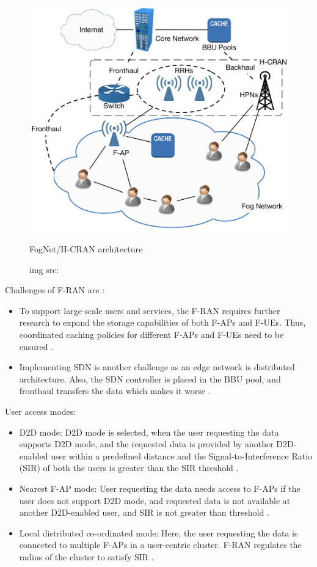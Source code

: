 \begin{figure}[H]
    \centering
    \includegraphics[width=.5\linewidth]{image/FogNet or H-CRAN architecture.png}
    \caption{FogNet/H-CRAN architecture}
    \caption*{img src: \cite{mukherjee2018survey}}
    \label{fig:fognet/h-cran architecture}
\end{figure}

Challenges of F-RAN are \cite{guizani2017cran}:
\begin{itemize}
    \item To support large-scale users and services, the F-RAN requires further research to expand the storage capabilities of both F-APs and F-UEs. Thus, coordinated caching policies for different F-APs and F-UEs need to be ensured \cite{guizani2017cran}.
    \item Implementing SDN is another challenge as an edge network is distributed architecture. Also, the SDN controller is placed in the BBU pool, and fronthaul transfers the data which makes it worse \cite{guizani2017cran}.
\end{itemize}

User access modes:
 \begin{itemize}
    \item D2D mode: D2D mode is selected, when the user requesting the data supports D2D mode, and the requested data is provided by another D2D-enabled user within a predefined distance and the Signal-to-Interference Ratio (SIR) of both the users is greater than the SIR threshold \cite{mukherjee2018survey}.
    \item Nearest F-AP mode: User requesting the data needs access to F-APs if the user does not support D2D mode, and requested data is not available at another D2D-enabled user, and SIR is not greater than threshold \cite{mukherjee2018survey}. 
    \item Local distributed co-ordinated mode: Here, the user requesting the data is connected to multiple F-APs in a user-centric cluster. F-RAN regulates the radius of the cluster to satisfy SIR \cite{mukherjee2018survey}. 
\end{itemize}

